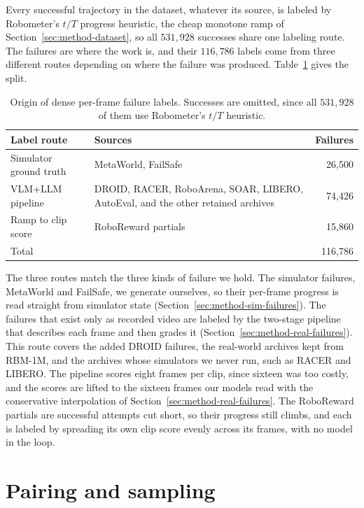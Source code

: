 Every successful trajectory in the dataset, whatever its source, is labeled by Robometer's $t/T$ progress heuristic, the cheap monotone ramp of Section~\ref{sec:method-dataset}, so all $531{,}928$ successes share one labeling route. The failures are where the work is, and their $116{,}786$ labels come from three different routes depending on where the failure was produced. Table~\ref{tab:roboref-labels} gives the split.

\begin{table}[h]
\centering\footnotesize
\caption[Sources of the failure labels]{Origin of dense per-frame failure labels. Successes are omitted, since all $531{,}928$ of them use Robometer's $t/T$ heuristic.}
\label{tab:roboref-labels}
\begin{tabular}{@{}p{4.0cm}p{6.0cm}r@{}}
\toprule
Label route & Sources & Failures \\
\midrule
Simulator ground truth & MetaWorld, FailSafe & 26{,}500 \\
VLM+LLM pipeline & DROID, RACER, RoboArena, SOAR, LIBERO, AutoEval, and the other retained archives & 74{,}426 \\
Ramp to clip score & RoboReward partials & 15{,}860 \\
\midrule
Total & & 116{,}786 \\
\bottomrule
\end{tabular}
\end{table}

The three routes match the three kinds of failure we hold. The simulator failures, MetaWorld and FailSafe, we generate ourselves, so their per-frame progress is read straight from simulator state (Section~\ref{sec:method-sim-failures}). The failures that exist only as recorded video are labeled by the two-stage pipeline that describes each frame and then grades it (Section~\ref{sec:method-real-failures}). This route covers the added DROID failures, the real-world archives kept from RBM-1M, and the archives whose simulators we never run, such as RACER and LIBERO. The pipeline scores eight frames per clip, since sixteen was too costly, and the scores are lifted to the sixteen frames our models read with the conservative interpolation of Section~\ref{sec:method-real-failures}. The RoboReward partials are successful attempts cut short, so their progress still climbs, and each is labeled by spreading its own clip score evenly across its frames, with no model in the loop.

\section{Pairing and sampling}

